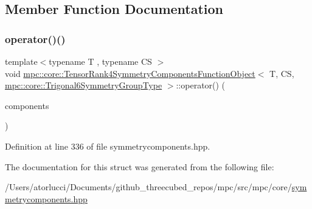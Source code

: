 \subsection{Member Function Documentation}
\mbox{\label{structmpc_1_1core_1_1_tensor_rank4_symmetry_components_function_object_3_01_t_00_01_c_s_00_01mpc8f8b6e3c3ae3ae919d47d056c15bff9d_aebf8dc9617bf12c1d8265727cb7f1f8a}} 
\subsubsection{\texorpdfstring{operator()()}{operator()()}}
{\footnotesize\ttfamily template$<$typename T , typename CS $>$ \\
void \mbox{\hyperlink{structmpc_1_1core_1_1_tensor_rank4_symmetry_components_function_object}{mpc\+::core\+::\+Tensor\+Rank4\+Symmetry\+Components\+Function\+Object}}$<$ T, CS, \mbox{\hyperlink{structmpc_1_1core_1_1_trigonal6_symmetry_group_type}{mpc\+::core\+::\+Trigonal6\+Symmetry\+Group\+Type}} $>$\+::operator() (\begin{DoxyParamCaption}\item[{std\+::set$<$ \mbox{\hyperlink{classmpc_1_1core_1_1_tensor_rank_n_component}{mpc\+::core\+::\+Tensor\+Rank\+N\+Component}}$<$ T, 4 $>$ $>$ \&}]{components }\end{DoxyParamCaption})\hspace{0.3cm}{\ttfamily [inline]}}



Definition at line 336 of file symmetrycomponents.\+hpp.



The documentation for this struct was generated from the following file\+:\begin{DoxyCompactItemize}
\item 
/\+Users/atorlucci/\+Documents/github\+\_\+threecubed\+\_\+repos/mpc/src/mpc/core/\mbox{\hyperlink{symmetrycomponents_8hpp}{symmetrycomponents.\+hpp}}\end{DoxyCompactItemize}
